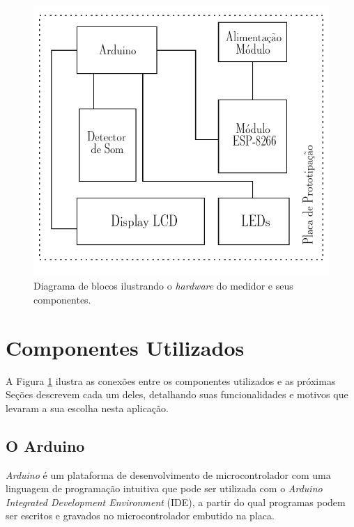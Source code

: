 \documentclass[
    12pt,               %
    openright,          %
    oneside,
    a4paper,            
    english,            %
    brazil              %
    ]{abntex2}
\begin{document}
\begin{figure}[!htb]
  \begin{center}
    \caption{\label{sistema}Diagrama de blocos ilustrando o \textit{hardware} do medidor e seus componentes.}
    \includegraphics[scale=0.68]{images/sistema.pdf}
  \end{center}
\end{figure}

\section{Componentes Utilizados}\label{comp-ut}

A Figura \ref{sistema} ilustra as conexões entre os componentes utilizados e as próximas Seções descrevem cada um deles, detalhando suas funcionalidades e motivos que levaram a sua escolha nesta aplicação.

\subsection{O Arduino}

\textit{Arduino} é um plataforma de desenvolvimento de microcontrolador com uma linguagem de programação intuitiva que pode ser utilizada com o \textit{Arduino} \textit{Integrated Development Environment} (IDE), a partir do qual programas podem ser escritos e gravados no microcontrolador embutido na placa.
\end{document}
